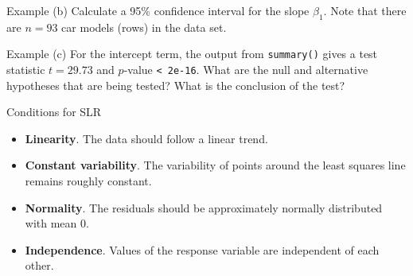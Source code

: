 \documentclass[10pt]{beamer}
\begin{document}
\begin{frame}{Example}
\vspace{-3.5cm}
(b) Calculate a 95\% confidence interval for the slope $\beta_1$.  Note that there are $n=93$ car models (rows) in the data set.\\
% 

\end{frame}

\begin{frame}{Example}
\vspace{-3.5cm}
(c) For the intercept term, the output from \texttt{summary()} gives a test statistic $t=29.73$ and $p$-value \texttt{< 2e-16}.  What are the null and alternative hypotheses that are being tested?  What is the conclusion of the test?
% 
% 
\end{frame}

\begin{frame}{Conditions for SLR}
\begin{itemize}
\item \textbf{Linearity}.  The data should follow a linear trend.
\vspace{5pt}
\item \textbf{Constant variability}.  The variability of points around the least squares line remains roughly constant.
\vspace{5pt}
\item \textbf{Normality}.  The residuals should be approximately normally distributed with mean 0.
\vspace{5pt}
\item \textbf{Independence}.  Values of the response variable are independent of each other. 
\end{itemize}
\end{frame}
\end{document}
